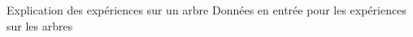 \begin{frame}{Explication des expériences sur un arbre}
\alert{Données en entrée} pour les expériences sur les arbres
\begin{figure}\centering
\end{figure}
\end{frame}

